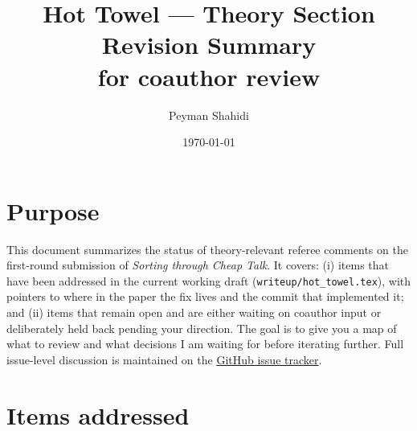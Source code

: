 \documentclass[11pt]{article}
\title{\vspace{-2em}Hot Towel --- Theory Section Revision Summary\\[0.3em]\large for coauthor review}
\author{Peyman Shahidi}
\date{\today}
\begin{document}
\maketitle
\vspace{-2em}

\section*{Purpose}

This document summarizes the status of theory-relevant referee comments on the first-round submission of \emph{Sorting through Cheap Talk}. It covers: (i) items that have been addressed in the current working draft (\texttt{writeup/hot\_towel.tex}), with pointers to where in the paper the fix lives and the commit that implemented it; and (ii) items that remain open and are either waiting on coauthor input or deliberately held back pending your direction. The goal is to give you a map of what to review and what decisions I am waiting for before iterating further. Full issue-level discussion is maintained on the \href{https://github.com/peymanshahidi/hot_towel_revision/issues}{GitHub issue tracker}.

\section*{Items addressed}
\end{document}
